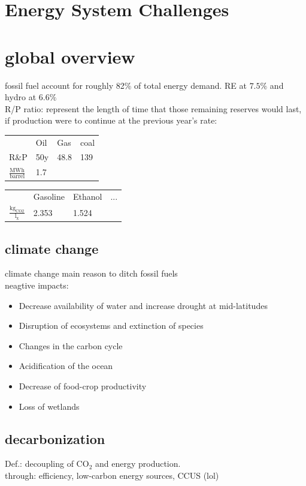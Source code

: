 \documentclass[a4paper,10pt,landscape]{scrartcl}
\begin{document}
\begin{multicols*}{3}
\section{Energy System Challenges}
\section{global overview}
fossil fuel account for roughly 82\% of total energy demand. RE at $7.5\%$ and hydro at $6.6\%$ \\
R/P ratio: represent the length of time that those remaining reserves would last,  if production were to continue at the previous year’s rate: \\
\begin{tabular}{|p{1cm}|p{2cm}|p{2cm}|p{2cm}|}
         & Oil & Gas & coal \\
    R\&P & 50y & 48.8 & 139 \\
    $\mathrm{\frac{MWh}{barrel}}$ & 1.7 & & \\
\end{tabular}
\begin{tabular}{|p{1cm}|p{2cm}|p{2cm}|p{2cm}|}
         & Gasoline & Ethanol & ... \\
    $\mathrm{\frac{kg_{CO2}}{l_x}}$ & 2.353 & 1.524 
\end{tabular}
    

\subsection{climate change}
climate change main reason to ditch fossil fuels \\
neagtive impacts:
\begin{itemize}
    \item Decrease availability of water and increase drought at mid-latitudes
    \item Disruption of ecosystems and extinction of species
    \item Changes in the carbon cycle
    \item Acidification of the ocean
    \item Decrease of food-crop productivity
    \item Loss of wetlands 
\end{itemize}

\subsection{decarbonization}
Def.: decoupling of $\mathrm{CO_2}$ and energy production. \\
through: efficiency, low-carbon energy sources, CCUS (lol) \\


\end{multicols*}
\end{document}
